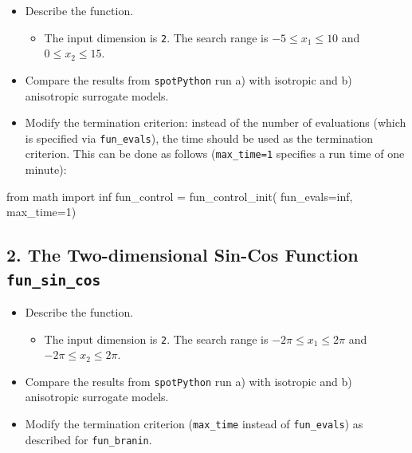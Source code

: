 \documentclass[
  letterpaper,
  DIV=11,
  numbers=noendperiod]{scrreprt}
\newenvironment{Shaded}{\begin{snugshade}}{\end{snugshade}}
\newcommand{\DecValTok}[1]{\textcolor[rgb]{0.68,0.00,0.00}{#1}}
\newcommand{\ImportTok}[1]{\textcolor[rgb]{0.00,0.46,0.62}{#1}}
\newcommand{\NormalTok}[1]{\textcolor[rgb]{0.00,0.23,0.31}{#1}}
\newcommand{\OperatorTok}[1]{\textcolor[rgb]{0.37,0.37,0.37}{#1}}
\providecommand{\tightlist}{%
  \setlength{\itemsep}{0pt}\setlength{\parskip}{0pt}}\usepackage{longtable,booktabs,array}
\begin{document}
\begin{itemize}
\tightlist
\item
  Describe the function.

  \begin{itemize}
  \tightlist
  \item
    The input dimension is \texttt{2}. The search range is
    \(-5 \leq x_1 \leq 10\) and \(0 \leq x_2 \leq 15\).
  \end{itemize}
\item
  Compare the results from \texttt{spotPython} run a) with isotropic and
  b) anisotropic surrogate models.
\item
  Modify the termination criterion: instead of the number of evaluations
  (which is specified via \texttt{fun\_evals}), the time should be used
  as the termination criterion. This can be done as follows
  (\texttt{max\_time=1} specifies a run time of one minute):
\end{itemize}

\begin{Shaded}
\begin{Highlighting}[]
\ImportTok{from}\NormalTok{ math }\ImportTok{import}\NormalTok{ inf}
\NormalTok{fun\_control }\OperatorTok{=}\NormalTok{ fun\_control\_init(}
\NormalTok{              fun\_evals}\OperatorTok{=}\NormalTok{inf,}
\NormalTok{              max\_time}\OperatorTok{=}\DecValTok{1}\NormalTok{)}
\end{Highlighting}
\end{Shaded}

\subsection{\texorpdfstring{2. The Two-dimensional Sin-Cos Function
\texttt{fun\_sin\_cos}}{2. The Two-dimensional Sin-Cos Function fun\_sin\_cos}}\label{the-two-dimensional-sin-cos-function-fun_sin_cos}

\begin{itemize}
\tightlist
\item
  Describe the function.

  \begin{itemize}
  \tightlist
  \item
    The input dimension is \texttt{2}. The search range is
    \(-2\pi \leq x_1 \leq 2\pi\) and \(-2\pi \leq x_2 \leq 2\pi\).
  \end{itemize}
\item
  Compare the results from \texttt{spotPython} run a) with isotropic and
  b) anisotropic surrogate models.
\item
  Modify the termination criterion (\texttt{max\_time} instead of
  \texttt{fun\_evals}) as described for \texttt{fun\_branin}.
\end{itemize}
\end{document}
